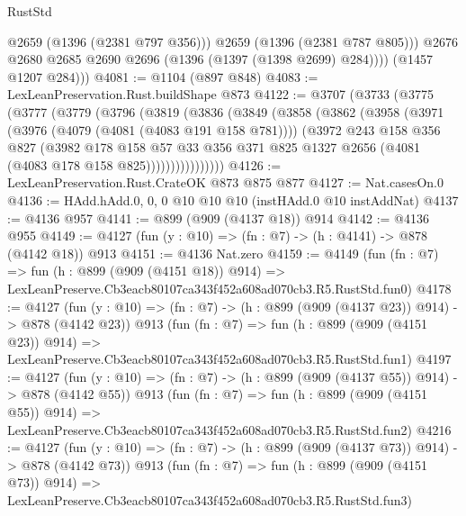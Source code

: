 \begin{lexlean}{RustStd}
\begin{coremodule}
                @2659
                (@1396 (@2381 @797 @356)))
              @2659
              (@1396 (@2381 @787 @805)))
            @2676
            @2680
            @2685
            @2690
            @2696
            (@1396 (@1397 (@1398 @2699) @284))))
        (@1457 @1207 @284)))
@4081 := @1104 (@897 @848)
@4083 := LexLeanPreservation.Rust.buildShape @873
@4122 := @3707
    (@3733
      (@3775
        (@3777
          (@3779
            (@3796
              (@3819
                (@3836
                  (@3849
                    (@3858
                      (@3862
                        (@3958
                          (@3971
                            (@3976 (@4079 (@4081 (@4083 @191 @158 @781))))
                            (@3972
                              @243
                              @158
                              @356
                              @827
                              (@3982
                                @178
                                @158
                                @57
                                @33
                                @356
                                @371
                                @825
                                @1327
                                @2656
                                (@4081 (@4083 @178 @158 @825))))))))))))))))
@4126 := LexLeanPreservation.Rust.CrateOK @873 @875 @877
@4127 := Nat.casesOn.{0}
@4136 := HAdd.hAdd.{0, 0, 0} @10 @10 @10 (instHAdd.{0} @10 instAddNat)
@4137 := @4136 @957
@4141 := @899 (@909 (@4137 @18)) @914
@4142 := @4136 @955
@4149 := @4127 (fun (y : @10) => (fn : @7) -> (h : @4141) -> @878 (@4142 @18)) @913
@4151 := @4136 Nat.zero
@4159 := @4149
    (fun (fn : @7) =>
    fun (h : @899 (@909 (@4151 @18)) @914) =>
    LexLeanPreserve.Cb3eacb80107ca343f452a608ad070cb3.R5.RustStd.fun0)
@4178 := @4127
    (fun (y : @10) => (fn : @7) -> (h : @899 (@909 (@4137 @23)) @914) -> @878 (@4142 @23))
    @913
    (fun (fn : @7) =>
    fun (h : @899 (@909 (@4151 @23)) @914) =>
    LexLeanPreserve.Cb3eacb80107ca343f452a608ad070cb3.R5.RustStd.fun1)
@4197 := @4127
    (fun (y : @10) => (fn : @7) -> (h : @899 (@909 (@4137 @55)) @914) -> @878 (@4142 @55))
    @913
    (fun (fn : @7) =>
    fun (h : @899 (@909 (@4151 @55)) @914) =>
    LexLeanPreserve.Cb3eacb80107ca343f452a608ad070cb3.R5.RustStd.fun2)
@4216 := @4127
    (fun (y : @10) => (fn : @7) -> (h : @899 (@909 (@4137 @73)) @914) -> @878 (@4142 @73))
    @913
    (fun (fn : @7) =>
    fun (h : @899 (@909 (@4151 @73)) @914) =>
    LexLeanPreserve.Cb3eacb80107ca343f452a608ad070cb3.R5.RustStd.fun3)

\end{coremodule}
\end{lexlean}
